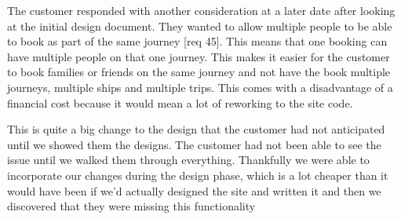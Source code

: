 \documentclass{article}
\begin{document}
The customer responded with another consideration at a later date after looking at the initial design document. They wanted to allow multiple people to be able to book as part of the same journey [req 45]. This means that one booking can have multiple people on that one journey. This makes it easier for the customer to book families or friends on the same journey and not have the book multiple journeys, multiple ships and multiple trips. This comes with a disadvantage of a financial cost because it would mean a lot of reworking to the site code.

This is quite a big change to the design that the customer had not anticipated until we showed them the designs. The customer had not been able to see the issue until we walked them through everything. Thankfully we were able to incorporate our changes during the design phase, which is a lot cheaper than it would have been if we'd actually designed the site and written it and then we discovered that they were missing this functionality
\\
\\
\end{document}
